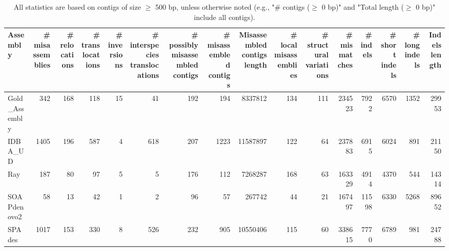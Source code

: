 \documentclass[12pt,a4paper]{article}
\begin{document}
\begin{table}[ht]
\begin{center}
\caption{All statistics are based on contigs of size $\geq$ 500 bp, unless otherwise noted (e.g., "\# contigs ($\geq$ 0 bp)" and "Total length ($\geq$ 0 bp)" include all contigs).}
\begin{tabular}{|l*{15}{|r}|}
\hline
Assembly & \# misassemblies &     \# relocations &     \# translocations &     \# inversions &     \# interspecies translocations & \# possibly misassembled contigs & \# misassembled contigs & Misassembled contigs length & \# local misassemblies & \# structural variations & \# mismatches & \# indels &     \# short indels &     \# long indels & Indels length \\ \hline
Gold\_Assembly & 342 & 168 & 118 & 15 & 41 & 192 & 194 & 8337812 & 134 & 111 & 234523 & 7922 & 6570 & 1352 & 29953 \\ \hline
IDBA\_UD & 1405 & 196 & 587 & 4 & 618 & 207 & 1223 & 11587897 & 122 & 64 & 237883 & 6915 & 6024 & 891 & 21150 \\ \hline
Ray & 187 & 80 & 97 & 5 & 5 & 176 & 112 & 7268287 & 168 & 63 & 163329 & 4914 & 4370 & 544 & 14314 \\ \hline
SOAPdenovo2 & 58 & 13 & 42 & 1 & 2 & 96 & 57 & 267742 & 44 & 21 & 167497 & 11598 & 6330 & 5268 & 89652 \\ \hline
SPAdes & 1017 & 153 & 330 & 8 & 526 & 232 & 905 & 10550406 & 115 & 60 & 338615 & 7770 & 6789 & 981 & 24788 \\ \hline
\end{tabular}
\end{center}
\end{table}
\end{document}
